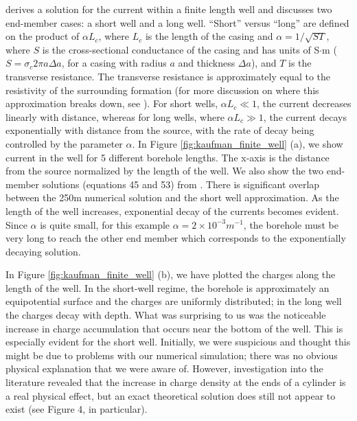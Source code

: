 \citep{Kaufman1993} derives a solution for the current within a finite length well and discusses two end-member cases: a short well and a long well. ``Short'' versus ``long'' are defined on the product of $\alpha L_c$, where $L_c$ is the length of the casing and $\alpha = 1/\sqrt{S T}$, where $S$ is the cross-sectional conductance of the casing and has units of S$\cdot$m ($S = \sigma_c 2\pi a \Delta a$, for a casing with radius $a$ and thickness $\Delta a$), and $T$ is the transverse resistance. The transverse resistance  is approximately equal to the resistivity of the surrounding formation (for more discussion on where this approximation breaks down, see \cite{Schenkel1994}). For short wells, $\alpha L_c \ll 1$, the current decreases linearly with distance, whereas for long wells, where $\alpha L_c \gg 1$, the current decays exponentially with distance from the source, with the rate of decay being controlled by the parameter $\alpha$. In Figure \ref{fig:kaufman_finite_well} (a), we show current in the well for 5 different borehole lengths. The x-axis is the distance from the source normalized by the length of the well. We also show the two end-member solutions (equations 45 and 53) from \cite{Kaufman1993}. There is significant overlap between the 250m numerical solution and the short well approximation. As the length of the well increases, exponential decay of the currents becomes evident. Since $\alpha$ is quite small, for this example $\alpha = 2 \times 10^{-3} m^{-1}$, the borehole must be very long to reach the other end member which corresponds to the exponentially decaying solution.

In Figure \ref{fig:kaufman_finite_well} (b), we have plotted the charges along the length of the well. In the short-well regime, the borehole is approximately an equipotential surface and the charges are uniformly distributed; in the long well the charges decay with depth. What was surprising to us was the noticeable increase in charge accumulation that occurs near the bottom of the well. This is especially evident for the short well. Initially, we were suspicious and thought this might be due to problems with our numerical simulation; there was no obvious physical explanation that we were aware of. However, investigation into the literature revealed that the increase in charge density at the ends of a cylinder is a real physical effect, but an exact theoretical solution does still not appear to exist \citep{Griffiths1997} (see Figure 4, in particular).

